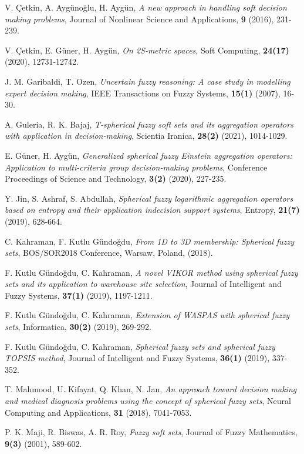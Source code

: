 \documentclass{IJFS}
\begin{document}
\begin{thebibliography}{1}
 V. \c{C}etkin, A. Ayg\"{u}no\u glu, H. Ayg\"{u}n, {\it A new approach in handling soft
decision making problems}, Journal of Nonlinear Science and
Applications, {\bf 9} (2016), 231-239.

 V. \c{C}etkin, E. G\"{u}ner, H. Ayg\"{u}n,  {\it On 2S-metric spaces}, Soft Computing, {\bf 24(17)} (2020), 12731-12742.

 J. M. Garibaldi, T. Ozen, {\it Uncertain fuzzy reasoning: A case study in modelling
expert decision making},  IEEE Transactions on Fuzzy Systems,
{\bf 15(1)} (2007), 16-30.

 A. Guleria, R. K. Bajaj, {\it T-spherical fuzzy soft sets and its aggregation operators with application in decision-making}, Scientia Iranica, {\bf 28(2)} (2021), 1014-1029.

 E. G\"{u}ner, H. Ayg\"{u}n, {\it Generalized spherical fuzzy Einstein aggregation operators: Application to multi-criteria group decision-making problems}, Conference Proceedings of Science and Technology, {\bf 3(2)} (2020), 227-235.
 
 Y. Jin, S. Ashraf, S. Abdullah, {\it Spherical fuzzy logarithmic
aggregation operators based on entropy and their application
indecision support systems}, Entropy, {\bf 21(7)} (2019), 628-664.

 C. Kahraman, F. Kutlu G\"{u}ndo\u gdu, {\it From 1D to 3D membership: Spherical fuzzy
sets}, BOS/SOR2018 Conference, Warsaw, Poland, (2018).

 F. Kutlu G\"{u}ndo\u gdu, C. Kahraman, {\it A novel VIKOR method using spherical
fuzzy sets and its application to warehouse site selection}, Journal
of Intelligent and Fuzzy Systems, {\bf 37(1)} (2019), 1197-1211.

 F. Kutlu G\"{u}ndo\u gdu, C. Kahraman, {\it Extension of WASPAS with spherical
fuzzy sets}, Informatica, {\bf 30(2)} (2019), 269-292.

 F. Kutlu G\"{u}ndo\u gdu, C. Kahraman, {\it Spherical fuzzy sets and spherical
fuzzy TOPSIS method}, Journal of Intelligent and Fuzzy Systems,
{\bf 36(1)} (2019), 337-352.

 T. Mahmood, U. Kifayat, Q. Khan, N. Jan, {\it An approach toward decision
making and medical diagnosis problems using the concept of
spherical fuzzy sets}, Neural Computing and Applications, {\bf 31} (2018),
7041-7053.


 P. K. Maji, R. Biswas, A. R.  Roy, {\it Fuzzy soft sets}, Journal of Fuzzy Mathematics, {\bf 9(3)} (2001), 589-602.


\end{thebibliography}
\end{document}
